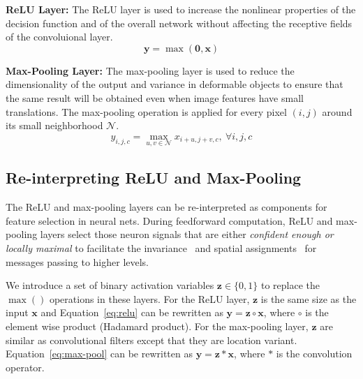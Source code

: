 \textbf{ReLU Layer:}
The ReLU layer is used to increase the nonlinear properties of the decision function and of the overall network without affecting the receptive fields of the convoluional layer.
\begin{equation}
\mathbf{y} = \max (\mathbf{0}, \mathbf{x})
\label{eq:relu}
\end{equation}

\textbf{Max-Pooling Layer:}
The max-pooling layer is used to reduce the dimensionality of the output and variance in deformable objects to ensure that the same result will be obtained even when image features have small translations. The max-pooling operation is applied for every pixel $(i,j)$ around its small neighborhood $\mathcal{N}$.
\begin{equation}
y_{i,j,c} = \max_{u,v \in \mathcal{N}} x_{i+u, j+v, c},\ \forall i, j, c
\label{eq:max-pool}
\end{equation}

\subsection{Re-interpreting ReLU and Max-Pooling}
The ReLU and max-pooling layers can be re-interpreted as components for feature selection in neural nets. During feedforward computation, ReLU and max-pooling layers select those neuron signals that are either \emph{confident enough or locally maximal} to facilitate the invariance~\cite{riesenhuber1999hierarchical} and spatial assignments~\cite{weng1992cresceptron} for messages passing to higher levels.

We introduce a set of binary activation variables $\mathbf{z} \in \{0, 1\}$ to replace the $\max()$ operations in these layers. For the ReLU layer, $\mathbf{z}$ is the same size as the input $\mathbf{x}$ and Equation~\ref{eq:relu} can be rewritten as $\mathbf{y} = \mathbf{z} \circ \mathbf{x}$, where $\circ$ is the element wise product (Hadamard product). For the max-pooling layer, $\mathbf{z}$ are similar as convolutional filters except that they are location variant. Equation~\ref{eq:max-pool} can be rewritten as $\mathbf{y} = \mathbf{z} * \mathbf{x}$, where $*$ is the convolution operator.

